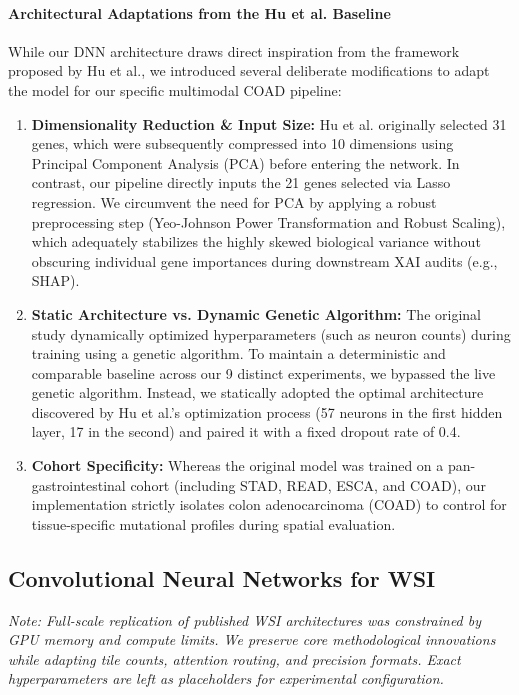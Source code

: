 \documentclass[11pt,a4paper]{article}
\begin{document}
\paragraph{Architectural Adaptations from the Hu et al. Baseline}
While our DNN architecture draws direct inspiration from the framework proposed by Hu et al., we introduced several deliberate modifications to adapt the model for our specific multimodal COAD pipeline:
\begin{enumerate}
    \item \textbf{Dimensionality Reduction \& Input Size:} Hu et al. originally selected 31 genes, which were subsequently compressed into 10 dimensions using Principal Component Analysis (PCA) before entering the network. In contrast, our pipeline directly inputs the 21 genes selected via Lasso regression. We circumvent the need for PCA by applying a robust preprocessing step (Yeo-Johnson Power Transformation and Robust Scaling), which adequately stabilizes the highly skewed biological variance without obscuring individual gene importances during downstream XAI audits (e.g., SHAP).
    \item \textbf{Static Architecture vs. Dynamic Genetic Algorithm:} The original study dynamically optimized hyperparameters (such as neuron counts) during training using a genetic algorithm. To maintain a deterministic and comparable baseline across our 9 distinct experiments, we bypassed the live genetic algorithm. Instead, we statically adopted the optimal architecture discovered by Hu et al.'s optimization process (57 neurons in the first hidden layer, 17 in the second) and paired it with a fixed dropout rate of 0.4.
    \item \textbf{Cohort Specificity:} Whereas the original model was trained on a pan-gastrointestinal cohort (including STAD, READ, ESCA, and COAD), our implementation strictly isolates colon adenocarcinoma (COAD) to control for tissue-specific mutational profiles during spatial evaluation.
\end{enumerate}

\subsection{Convolutional Neural Networks for WSI}
\label{subsec:cnn_wsi}
\textit{Note: Full-scale replication of published WSI architectures was constrained by GPU memory and compute limits. We preserve core methodological innovations while adapting tile counts, attention routing, and precision formats. Exact hyperparameters are left as placeholders for experimental configuration.}
\end{document}
